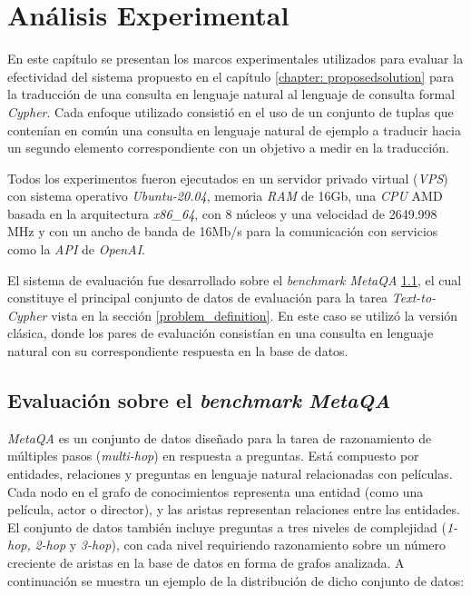 \chapter{Análisis Experimental}\label{chapter: experiment}

En este capítulo se presentan los marcos experimentales utilizados para evaluar la efectividad del sistema propuesto en el capítulo \ref{chapter: proposedsolution} para la traducción de una consulta en lenguaje natural al lenguaje de consulta formal \textit{Cypher}. Cada enfoque utilizado consistió en el uso de un conjunto de tuplas que contenían en común una consulta en lenguaje natural de ejemplo a traducir hacia un segundo elemento correspondiente con un objetivo a medir en la traducción.

Todos los experimentos fueron ejecutados en un servidor privado virtual (\textit{VPS}) \label{used_machine} con sistema operativo \textit{Ubuntu-20.04}, memoria \textit{RAM} de 16Gb, una \textit{CPU} AMD basada en la arquitectura \textit{x86\_64}, con 8 núcleos y una velocidad de 2649.998 MHz y con un ancho de banda de 16Mb/s para la comunicación con servicios como la \textit{API} de \textit{OpenAI}.

El sistema de evaluación fue desarrollado sobre el \textit{benchmark MetaQA} \ref{classic_metaqa}, el cual constituye el principal conjunto de datos de evaluación para la tarea \textit{Text-to-Cypher} vista en la sección \ref{problem_definition}. En este caso se utilizó la versión clásica, donde los pares de evaluación consistían en una consulta en lenguaje natural con su correspondiente respuesta en la base de datos.

\section{Evaluación sobre el \textit{benchmark} \textit{MetaQA} \cite{metaqa}} \label{classic_metaqa}
\textit{MetaQA} \cite{metaqa} es un conjunto de datos diseñado para la tarea de razonamiento de múltiples pasos (\textit{multi-hop}) en respuesta a preguntas. Está compuesto por entidades, relaciones y preguntas en lenguaje natural relacionadas con películas. Cada nodo en el grafo de conocimientos representa una entidad (como una película, actor o director), y las aristas representan relaciones entre las entidades. El conjunto de datos también incluye preguntas a tres niveles de complejidad (\textit{1-hop,} \textit{2-hop} y \textit{3-hop}), con cada nivel requiriendo razonamiento sobre un número creciente de aristas en la base de datos en forma de grafos analizada. A continuación se muestra un ejemplo de la distribución de dicho conjunto de datos:

